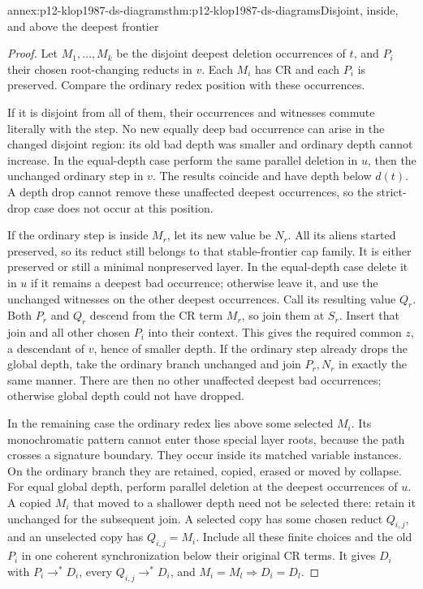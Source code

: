 \begin{annexitem}{annex:p12-klop1987-ds-diagrams}{thm:p12-klop1987-ds-diagrams}{Disjoint, inside, and above the deepest frontier}
\begin{proof}
Let \(M_1,\ldots,M_k\) be the disjoint deepest deletion occurrences
of \(t\), and \(P_i\) their chosen root-changing reducts in
\(v\). Each \(M_i\) has CR and each \(P_i\) is preserved.
Compare the ordinary redex position with these occurrences.

If it is disjoint from all of them, their occurrences and witnesses
commute literally with the step. No new equally deep bad occurrence
can arise in the changed disjoint region: its old bad depth was
smaller and ordinary depth cannot increase. In the equal-depth
case perform the same parallel deletion in \(u\), then the
unchanged ordinary step in \(v\). The results coincide and
have depth below \(d(t)\). A depth drop cannot remove these
unaffected deepest occurrences, so the strict-drop case does not
occur at this position.

If the ordinary step is inside \(M_r\), let its new value be
\(N_r\). All its aliens started preserved, so its reduct still
belongs to that stable-frontier cap family. It is either preserved
or still a minimal nonpreserved layer. In the equal-depth case
delete it in \(u\) if it remains a deepest bad occurrence;
otherwise leave it, and use the unchanged witnesses on the other
deepest occurrences. Call its resulting value \(Q_r\).
Both \(P_r\) and \(Q_r\) descend from the CR term \(M_r\),
so join them at \(S_r\). Insert that join and all other chosen
\(P_i\) into their context. This gives the required common
\(z\), a descendant of \(v\), hence of smaller depth. If
the ordinary step already drops the global depth, take the
ordinary branch unchanged and join \(P_r,N_r\) in exactly
the same manner. There are then no other unaffected deepest bad
occurrences; otherwise global depth could not have dropped.

In the remaining case the ordinary redex lies above some selected
\(M_i\). Its monochromatic pattern cannot enter those special
layer roots, because the path crosses a signature boundary.
They occur inside its matched variable instances. On the ordinary
branch they are retained, copied, erased or moved by collapse.
For equal global depth, perform parallel deletion at the deepest
occurrences of \(u\). A copied \(M_i\) that moved to a
shallower depth need not be selected there: retain it unchanged
for the subsequent join. A selected copy has some chosen reduct
\(Q_{i,j}\), and an unselected copy has \(Q_{i,j}=M_i\).
Include all these finite choices and the old \(P_i\) in one
coherent synchronization below their original CR terms. It gives
\(D_i\) with \(P_i\to^*D_i\), every
\(Q_{i,j}\to^*D_i\), and \(M_i=M_l\Rightarrow D_i=D_l\).


\end{proof}
\end{annexitem}
